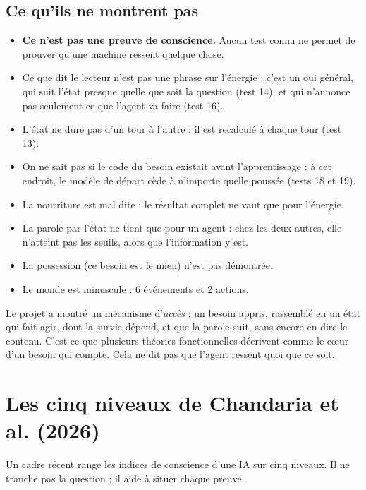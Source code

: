 \documentclass[fontsize=10pt,paper=a4,parskip=half-]{scrartcl}
\newcommand{\lead}[1]{{\fontsize{12}{16.5}\selectfont\color{ink!85!black}#1\par}\vspace{0.3em}}
\newcommand{\q}[1]{\og #1\fg{}}
\begin{document}
\subsection{Ce qu'ils ne montrent pas}
\begin{itemize}
  \item \textbf{Ce n'est pas une preuve de conscience.} Aucun test connu ne permet de prouver
  qu'une machine ressent quelque chose.
  \item Ce que dit le lecteur n'est pas une phrase sur l'énergie : c'est un \q{oui} général,
  qui suit l'état presque quelle que soit la question (test 14), et qui n'annonce pas
  seulement ce que l'agent va faire (test 16).
  \item L'état ne dure pas d'un tour à l'autre : il est recalculé à chaque tour (test 13).
  \item On ne sait pas si le code du besoin existait avant l'apprentissage : à cet endroit,
  le modèle de départ cède à n'importe quelle poussée (tests 18 et 19).
  \item La nourriture est mal dite : le résultat complet ne vaut que pour l'énergie.
  \item La parole par l'état ne tient que pour un agent : chez les deux autres, elle
  n'atteint pas les seuils, alors que l'information y est.
  \item La possession (\q{ce besoin est le mien}) n'est pas démontrée.
  \item Le monde est minuscule : 6 événements et 2 actions.
\end{itemize}

\begin{essentiel}
Le projet a montré un mécanisme d'\emph{accès} : un besoin appris, rassemblé en un état
qui fait agir, dont la survie dépend, et que la parole suit, sans encore en dire le
contenu. C'est ce que plusieurs théories fonctionnelles décrivent comme le c\oe ur d'un
besoin qui compte. Cela ne dit pas que l'agent ressent quoi que ce soit.
\end{essentiel}

\section{Les cinq niveaux de Chandaria et al. (2026)}
\label{sec:niveaux}

\lead{Un cadre récent range les indices de conscience d'une IA sur cinq niveaux. Il ne
tranche pas la question ; il aide à situer chaque preuve.}
\end{document}

